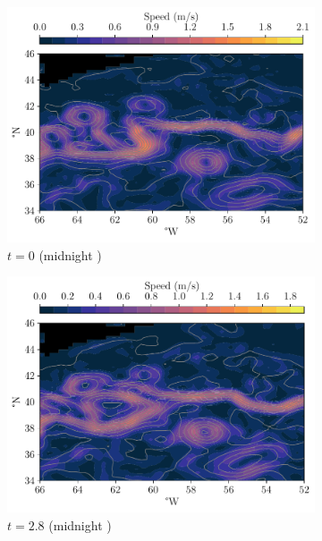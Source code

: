 \begin{figure}
	\begin{center}
		\begin{subfigure}{0.49\textwidth}
			\includegraphics[width=\textwidth]{chp06_applications/figures/gulf_stream/streamlines_0}
			\caption{\(t = 0\) (midnight )}
		\end{subfigure}
		\begin{subfigure}{0.49\textwidth}
			\includegraphics[width=\textwidth]{chp06_applications/figures/gulf_stream/streamlines_5}
			\caption{\(t = 2.8\) (midnight )}
		\end{subfigure}
		\begin{subfigure}{0.49\textwidth}

\end{subfigure}
\end{center}
\end{figure}
